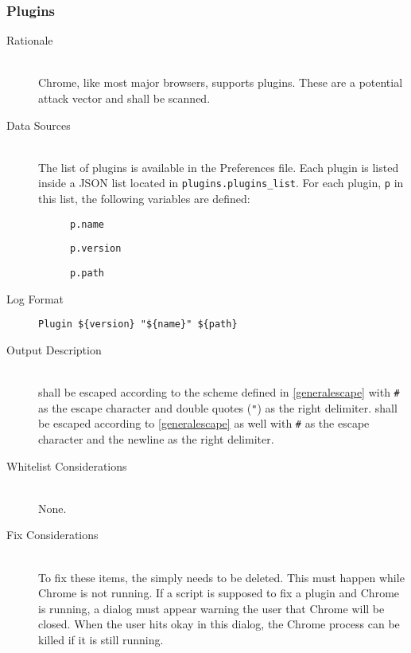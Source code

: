 \subsubsection{Plugins}
\begin{description}
\item[Rationale] \hfill \\
Chrome, like most major browsers, supports plugins.  These are a potential
attack vector and shall be scanned.
\item[Data Sources] \hfill \\
The list of plugins is available in the Preferences file.  Each plugin is listed
inside a JSON list located in \verb|plugins.plugins_list|.  For each plugin,
\texttt{p} in this list, the following variables are defined:
\begin{description}
\item[] \texttt{p.name}
\item[] \texttt{p.version}
\item[] \texttt{p.path}
\end{description}
\item[Log Format] \hfill
\vspace{-\baselineskip}
\begin{verbatim}
Plugin ${version} "${name}" ${path}
\end{verbatim}
\item[Output Description] \hfill \\
 shall be escaped according to the scheme defined in
\ref{generalescape} with \verb|#| as the escape character and double quotes
(\verb|"|) as the right delimiter.   shall be escaped according to
\ref{generalescape} as well with \verb|#| as the escape character and the
newline as the right delimiter.
\item[Whitelist Considerations] \hfill \\
None.
\item[Fix Considerations] \hfill \\
To fix these items, the  simply needs to be deleted.  This must
happen while Chrome is not running.  If a script is supposed to fix a
plugin and Chrome is running, a dialog must appear warning the user that
Chrome will be closed.  When the user hits okay in this dialog, the Chrome
process can be killed if it is still running.  
\end{description}

